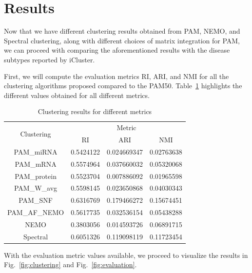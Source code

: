 
\section{Results}\label{sec:results}

Now that we have different clustering results obtained from PAM, NEMO, and Spectral clustering, along with different choices of matrix integration for PAM, we can proceed with comparing the aforementioned results with the disease subtypes reported by iCluster.

First, we will compute the evaluation metrics RI, ARI, and NMI for all the clustering algorithms proposed compared to the PAM50. Table~\ref{tab:results} highlights the different values obtained for all different metrics.

\begin{table}[!t]
    \centering
    \caption{Clustering results for different metrics}
    \begin{tabular}{|c|c|c|c|}
    \hline
    \multirow{2}{*}{Clustering} & \multicolumn{3}{c|}{Metric} \\ \cline{2-4} 
    & RI & ARI & NMI \\ \hline
    PAM\_miRNA & 0.5424122 & 0.024669347 & 0.02763638 \\
    PAM\_mRNA & 0.5574964 & 0.037660032 & 0.05320068 \\
    PAM\_protein & 0.5523704 & 0.007886092 & 0.01965598 \\
    PAM\_W\_avg & 0.5598145 & 0.023650868 & 0.04030343 \\
    PAM\_SNF & 0.6316769 & 0.179466272 & 0.15674451 \\
    PAM\_AF\_NEMO & 0.5617735 & 0.032536154 & 0.05438288 \\
    NEMO & 0.3803056 & 0.014593726 & 0.06891715 \\
    Spectral & 0.6051326 & 0.119098119 & 0.11723454 \\ \hline
    \end{tabular}
    \label{tab:results}
\end{table}

With the evaluation metric values available, we proceed to visualize the results in  Fig.~\ref{fig:clustering} and Fig.~\ref{fig:evaluation}.

